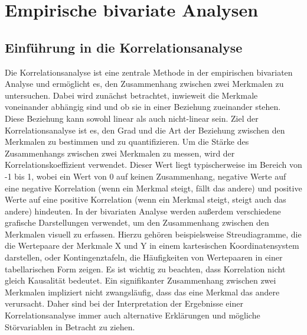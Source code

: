 \chapter{Empirische bivariate Analysen}


\section{Einführung in die Korrelationsanalyse}
Die Korrelationsanalyse ist eine zentrale Methode in der empirischen bivariaten Analyse und ermöglicht es, den Zusammenhang zwischen zwei Merkmalen zu untersuchen.
Dabei wird zunächst betrachtet, inwieweit die Merkmale voneinander abhängig sind und ob sie in einer Beziehung zueinander stehen.
Diese Beziehung kann sowohl linear als auch nicht-linear sein.
Ziel der Korrelationsanalyse ist es, den Grad und die Art der Beziehung zwischen den Merkmalen zu bestimmen und zu quantifizieren.
\newline \newline
Um die Stärke des Zusammenhangs zwischen zwei Merkmalen zu messen, wird der Korrelationskoeffizient verwendet.
Dieser Wert liegt typischerweise im Bereich von -1 bis 1, wobei ein Wert von 0 auf keinen Zusammenhang, negative Werte auf eine negative Korrelation (wenn ein Merkmal steigt, fällt das andere) und positive Werte auf eine positive Korrelation (wenn ein Merkmal steigt, steigt auch das andere) hindeuten.
\newline \newline
In der bivariaten Analyse werden außerdem verschiedene grafische Darstellungen verwendet, um den Zusammenhang zwischen den Merkmalen visuell zu erfassen.
Hierzu gehören beispielsweise Streudiagramme, die die Wertepaare der Merkmale X und Y in einem kartesischen Koordinatensystem darstellen, oder Kontingenztafeln, die Häufigkeiten von Wertepaaren in einer tabellarischen Form zeigen.
\newline \newline
Es ist wichtig zu beachten, dass Korrelation nicht gleich Kausalität bedeutet.
Ein signifikanter Zusammenhang zwischen zwei Merkmalen impliziert nicht zwangsläufig, dass das eine Merkmal das andere verursacht.
Daher sind bei der Interpretation der Ergebnisse einer Korrelationsanalyse immer auch alternative Erklärungen und mögliche Störvariablen in Betracht zu ziehen.

